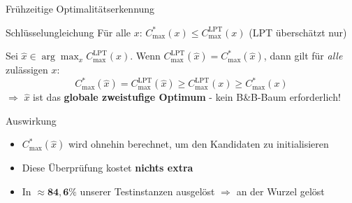 \documentclass[fleqn,11pt,aspectratio=43]{beamer}
\newcommand{\Copt}{C_{\max}^{*}}
\newcommand{\Clpt}{C_{\max}^{\mathrm{LPT}}}
\begin{document}
\begin{frame}[shrink=5]{Frühzeitige Optimalitätserkennung}
  \begin{block}{Schlüsselungleichung}
    Für alle $x$: $\Copt(x)\leq\Clpt(x)$ (LPT überschätzt nur)
  \end{block}
  Sei $\hat x\in\arg\max_x\Clpt(x)$. Wenn $\Clpt(\hat x)=\Copt(\hat x)$, dann gilt für \emph{alle} zulässigen $x$:
  \[\Copt(\hat x)=\Clpt(\hat x)\geq\Clpt(x)\geq\Copt(x)\]
  $\Rightarrow$ $\hat x$ ist das \textbf{globale zweistufige Optimum} - kein B\&B-Baum erforderlich!
  \begin{alertblock}{Auswirkung}
    \begin{itemize}
      \item $\Copt(\hat x)$ wird ohnehin berechnet, um den Kandidaten zu initialisieren
      \item Diese Überprüfung kostet \textbf{nichts extra}
      \item In $\approx\mathbf{84{,}6\%}$ unserer Testinstanzen ausgelöst $\Rightarrow$ an der Wurzel gelöst
    \end{itemize}
  \end{alertblock}
\end{frame}
\end{document}
